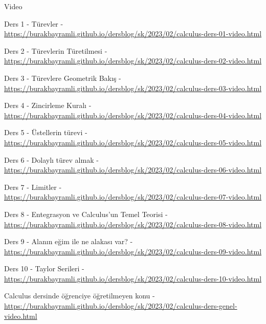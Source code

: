 \documentclass[12pt,fleqn]{article}\usepackage{../../common}
\begin{document}
Video

Ders 1 - Türevler - \url{https://burakbayramli.github.io/dersblog/sk/2023/02/calculus-ders-01-video.html}

Ders 2 - Türevlerin Türetilmesi - \url{https://burakbayramli.github.io/dersblog/sk/2023/02/calculus-ders-02-video.html}

Ders 3 - Türevlere Geometrik Bakış - \url{https://burakbayramli.github.io/dersblog/sk/2023/02/calculus-ders-03-video.html}

Ders 4 - Zincirleme Kuralı - \url{https://burakbayramli.github.io/dersblog/sk/2023/02/calculus-ders-04-video.html}

Ders 5 - Üstellerin türevi - \url{https://burakbayramli.github.io/dersblog/sk/2023/02/calculus-ders-05-video.html}

Ders 6 - Dolaylı türev almak - \url{https://burakbayramli.github.io/dersblog/sk/2023/02/calculus-ders-06-video.html}

Ders 7 - Limitler - \url{https://burakbayramli.github.io/dersblog/sk/2023/02/calculus-ders-07-video.html}

Ders 8 -  Entegrasyon ve Calculus'un Temel Teorisi - \url{https://burakbayramli.github.io/dersblog/sk/2023/02/calculus-ders-08-video.html}

Ders 9 - Alanın eğim ile ne alakası var? - \url{https://burakbayramli.github.io/dersblog/sk/2023/02/calculus-ders-09-video.html}

Ders 10 - Taylor Serileri - \url{https://burakbayramli.github.io/dersblog/sk/2023/02/calculus-ders-10-video.html}

Calculus dersinde öğrenciye öğretilmeyen konu - \url{https://burakbayramli.github.io/dersblog/sk/2023/02/calculus-ders-genel-video.html}
\end{document}
